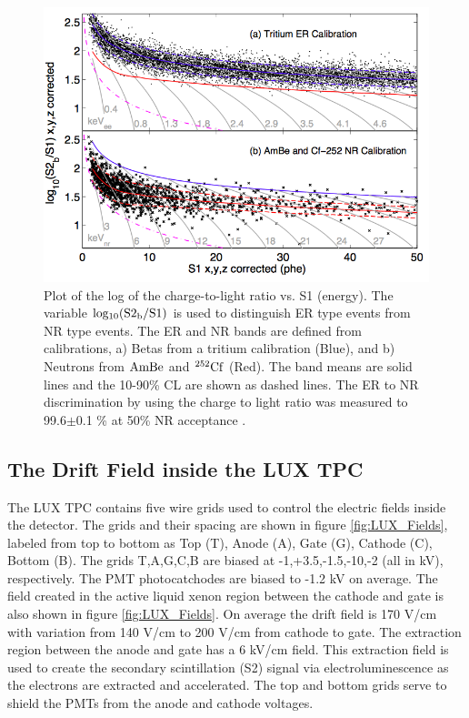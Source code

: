  \begin{figure}[h!]\centering
\includegraphics[scale=.5]{Chapter_LUX_Det/ER_NR_Band_Cal.png}
\caption{Plot of the log of the charge-to-light ratio vs. S1 (energy). The variable $\rm log_{10}(S2_b/S1)$ is used to distinguish ER type events from NR type events. The ER and NR bands are defined from calibrations, a) Betas from a tritium calibration (Blue), and b) Neutrons from $\rm AmBe$ and $\rm ^{252}Cf$ (Red). The band means are solid lines and the 10-90\% CL are shown as dashed lines. The ER to NR discrimination by using the charge to light ratio was measured to 99.6$\pm$0.1 \% at 50\% NR acceptance \cite{LUX_PRL}.}
\label{fig:LUX_ER_NR_Band}
\end{figure}

\newpage

\subsection{The Drift Field inside the LUX TPC}

The LUX TPC contains five wire grids used to control the electric fields inside the detector. The grids and their spacing are shown in figure \ref{fig:LUX_Fields}, labeled from top to bottom as Top  (T), Anode (A), Gate (G), Cathode (C), Bottom (B). The grids T,A,G,C,B are biased at -1,+3.5,-1.5,-10,-2 (all in kV), respectively. The PMT photocatchodes are biased to -1.2 kV on average. The field created in the active liquid xenon region between the cathode and gate is also shown in figure \ref{fig:LUX_Fields}. On average the drift field is 170 V/cm with variation from 140 V/cm to 200 V/cm  from cathode to gate. The extraction region between the anode and gate has a 6 kV/cm field. This extraction field is used to create the secondary scintillation (S2) signal via electroluminescence as the electrons are extracted and accelerated. The top and bottom grids serve to shield the PMTs from the anode and cathode voltages.  

